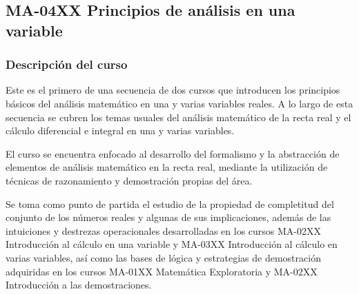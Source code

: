 \newpage
\subsection*{MA-04XX Principios de análisis en una variable}

\begin{refsection}
\begin{table}[H]
\end{table}



\subsubsection*{Descripción del curso}

Este es el primero de una secuencia de dos cursos que introducen los principios básicos del análisis matemático en una y varias variables reales. A lo largo de esta secuencia se cubren los temas usuales del análisis matemático
de la recta real y el cálculo diferencial e integral en una y varias variables. 

El curso se encuentra enfocado al desarrollo del formalismo y la abstracción de elementos de análisis matemático en la recta real, mediante la utilización de técnicas de razonamiento y demostración propias del área.

Se toma como punto de partida el estudio de la propiedad de completitud del conjunto de los números reales y algunas de sus implicaciones, además de las intuiciones y destrezas operacionales desarrolladas en los cursos MA-02XX Introducción al cálculo en una variable y MA-03XX Introducción al cálculo en varias variables, así como las bases de lógica y estrategias de demostración adquiridas en los cursos MA-01XX Matemática Exploratoria y MA-02XX Introducción a las demostraciones.






\end{refsection}
